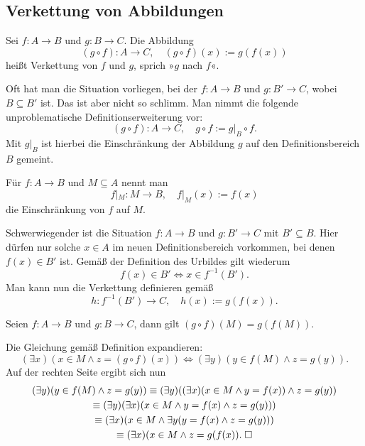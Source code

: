 \subsection{Verkettung von Abbildungen}
\begin{Definition}[Verkettung]
Sei $f\colon A\to B$ und $g\colon B\to C$. Die Abbildung
\[(g\circ f)\colon A\to C,\quad (g\circ f)(x):=g(f(x))\]
heißt Verkettung von $f$ und $g$, sprich »$g$ nach $f$«.
\end{Definition}

\noindent
Oft hat man die Situation vorliegen, bei der $f\colon A\to B$
und $g\colon B'\to C$, wobei $B\subseteq B'$ ist. Das ist aber
nicht so schlimm. Man nimmt die folgende unproblematische
Definitionserweiterung vor:
\[(g\circ f)\colon A\to C,\quad g\circ f := g|_B\circ f.\]
Mit $g|_B$ ist hierbei die Einschränkung der Abbildung $g$
auf den Definitionsbereich $B$ gemeint.

\begin{Definition}[Einschränkung]
Für $f\colon A\to B$ und $M\subseteq A$ nennt man
\[f|_M\colon M\to B,\quad f|_M(x):=f(x)\]
die Einschränkung von $f$ auf $M$.
\end{Definition}

\noindent
Schwerwiegender ist die Situation $f\colon A\to B$
und $g\colon B'\to C$ mit $B'\subseteq B$. Hier dürfen nur
solche $x\in A$ im neuen Definitionsbereich vorkommen, bei
denen $f(x)\in B'$ ist. Gemäß der Definition des Urbildes
gilt wiederum
\[f(x)\in B'\iff x\in f^{-1}(B').\]
Man kann nun die Verkettung definieren gemäß
\[h\colon f^{-1}(B')\to C,\quad h(x):=g(f(x)).\]

\begin{Satz}\label{img-comp}
Seien $f\colon A\to B$ und $g\colon B\to C$, dann gilt
$(g\circ f)(M) = g(f(M))$.
\end{Satz}
 Die Gleichung gemäß Definition expandieren:
\[(\exists x)(x\in M\land z
= (g\circ f)(x))\iff (\exists y)(y\in f(M)\land z=g(y)).\]
Auf der rechten Seite ergibt sich nun
\begin{gather*}
(\exists y)(y\in f(M)\land z=g(y))
\equiv (\exists y)((\exists x)(x\in M\land y=f(x))\land z=g(y))\\
\equiv (\exists y)(\exists x)(x\in M\land y=f(x)\land z=g(y)))\\
\equiv (\exists x)(x\in M\land\exists y(y=f(x)\land z=g(y)))\\
\equiv (\exists x)(x\in M\land z=g(f(x)).\;\Box
\end{gather*}


